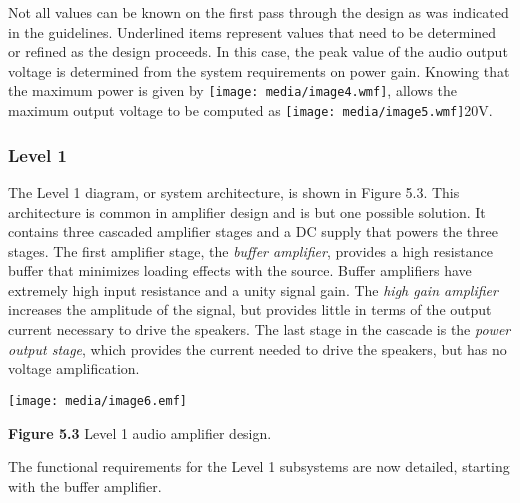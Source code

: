 Not all values can be known on the first pass through the design as was
indicated in the guidelines. Underlined items represent values that need
to be determined or refined as the design proceeds. In this case, the
peak value of the audio output voltage is determined from the system
requirements on power gain. Knowing that the maximum power is given by
\texttt{[image: media/image4.wmf]}, allows the maximum output voltage to
be computed as \texttt{[image: media/image5.wmf]}20V.

\subsubsection*{Level 1}\label{level-1}

The Level 1 diagram, or system architecture, is shown in Figure 5.3.
This architecture is common in amplifier design and is but one possible
solution. It contains three cascaded amplifier stages and a DC supply
that powers the three stages. The first amplifier stage, the
\emph{buffer amplifier}, provides a high resistance buffer that
minimizes loading effects with the source. Buffer amplifiers have
extremely high input resistance and a unity signal gain. The \emph{high
gain amplifier} increases the amplitude of the signal, but provides
little in terms of the output current necessary to drive the speakers.
The last stage in the cascade is the \emph{power output stage}, which
provides the current needed to drive the speakers, but has no voltage
amplification.

\texttt{[image: media/image6.emf]}

\textbf{Figure 5.3} Level 1 audio amplifier design.

The functional requirements for the Level 1 subsystems are now detailed,
starting with the buffer amplifier.

